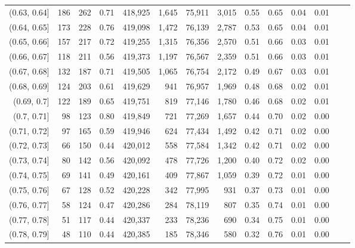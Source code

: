 \begin{tabular}{rrrrrrrrrrrrrr}
(0.63, 0.64]   &     186 &    262 &   0.71 &  418,925 &    1,645 &  75,911 &   3,015 &  0.55 &  0.65 &  0.04 &      0.01 \\
(0.64, 0.65]   &     173 &    228 &   0.76 &  419,098 &    1,472 &  76,139 &   2,787 &  0.53 &  0.65 &  0.04 &      0.01 \\
(0.65, 0.66]   &     157 &    217 &   0.72 &  419,255 &    1,315 &  76,356 &   2,570 &  0.51 &  0.66 &  0.03 &      0.01 \\
(0.66, 0.67]   &     118 &    211 &   0.56 &  419,373 &    1,197 &  76,567 &   2,359 &  0.51 &  0.66 &  0.03 &      0.01 \\
(0.67, 0.68]   &     132 &    187 &   0.71 &  419,505 &    1,065 &  76,754 &   2,172 &  0.49 &  0.67 &  0.03 &      0.01 \\
(0.68, 0.69]   &     124 &    203 &   0.61 &  419,629 &      941 &  76,957 &   1,969 &  0.48 &  0.68 &  0.02 &      0.01 \\
(0.69, 0.7]    &     122 &    189 &   0.65 &  419,751 &      819 &  77,146 &   1,780 &  0.46 &  0.68 &  0.02 &      0.01 \\
(0.7, 0.71]    &      98 &    123 &   0.80 &  419,849 &      721 &  77,269 &   1,657 &  0.44 &  0.70 &  0.02 &      0.00 \\
(0.71, 0.72]   &      97 &    165 &   0.59 &  419,946 &      624 &  77,434 &   1,492 &  0.42 &  0.71 &  0.02 &      0.00 \\
(0.72, 0.73]   &      66 &    150 &   0.44 &  420,012 &      558 &  77,584 &   1,342 &  0.42 &  0.71 &  0.02 &      0.00 \\
(0.73, 0.74]   &      80 &    142 &   0.56 &  420,092 &      478 &  77,726 &   1,200 &  0.40 &  0.72 &  0.02 &      0.00 \\
(0.74, 0.75]   &      69 &    141 &   0.49 &  420,161 &      409 &  77,867 &   1,059 &  0.39 &  0.72 &  0.01 &      0.00 \\
(0.75, 0.76]   &      67 &    128 &   0.52 &  420,228 &      342 &  77,995 &     931 &  0.37 &  0.73 &  0.01 &      0.00 \\
(0.76, 0.77]   &      58 &    124 &   0.47 &  420,286 &      284 &  78,119 &     807 &  0.35 &  0.74 &  0.01 &      0.00 \\
(0.77, 0.78]   &      51 &    117 &   0.44 &  420,337 &      233 &  78,236 &     690 &  0.34 &  0.75 &  0.01 &      0.00 \\
(0.78, 0.79]   &      48 &    110 &   0.44 &  420,385 &      185 &  78,346 &     580 &  0.32 &  0.76 &  0.01 &      0.00 \\

\end{tabular}

